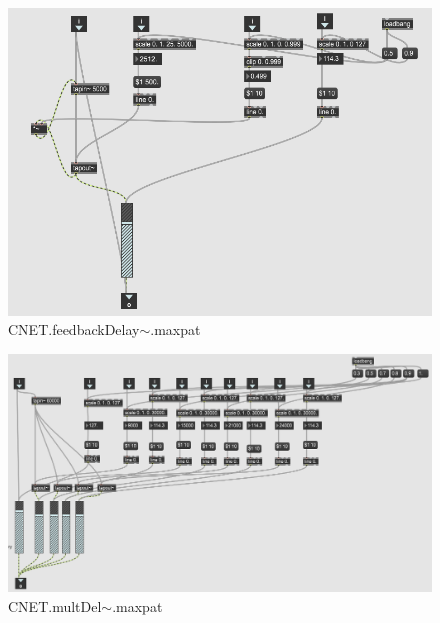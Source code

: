 \begin{figure}
    \centering
    \includegraphics{diagrams/maxPatches/CNET.feedbackDelay~.png}
    \caption{CNET.feedbackDelay$\sim$.maxpat}
    \label{fig:fbDelMaxpat}
\end{figure}

\begin{figure}
    \centering
    \includegraphics[scale=0.7]{diagrams/maxPatches/CNET.multDel~.png}
    \caption{CNET.multDel$\sim$.maxpat}
    \label{fig:multDel}
\end{figure}

